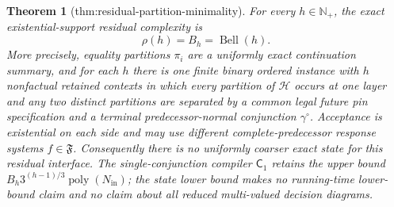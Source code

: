 \documentclass{article}
\newtheorem{theorem}{Theorem}
\begin{document}
\begin{theorem}[thm:residual-partition-minimality]\label{thm:residual-partition-minimality}
For every \(h\in\mathbb N_{+}\), the exact existential-support residual complexity is
\[
 \rho(h)=B_h=\operatorname{Bell}(h).
\]
More precisely, equality partitions \(\pi_i\) are a uniformly exact continuation summary, and for each \(h\) there is one finite binary ordered instance with \(h\) nonfactual retained contexts in which every partition of \(\mathcal H\) occurs at one layer and any two distinct partitions are separated by a common legal future pin specification and a terminal predecessor-normal conjunction \(\gamma^{\circ}\). Acceptance is existential on each side and may use different complete-predecessor response systems \(f\in\mathfrak F\). Consequently there is no uniformly coarser exact state for this residual interface. The single-conjunction compiler \(\mathsf C_1\) retains the upper bound \(B_h3^{(h-1)/3}\operatorname{poly}(N_{\mathrm{in}})\); the state lower bound makes no running-time lower-bound claim and no claim about all reduced multi-valued decision diagrams.
\end{theorem}
\end{document}
